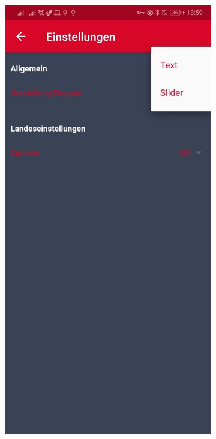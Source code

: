 	\begin{figure}[H]
		\centering
		\begin{subfigure}[b]{0.45\textwidth}
			\centering
			\includegraphics[width=1\textwidth]{../include/images/settings/settings01}

\end{subfigure}
\end{figure}
